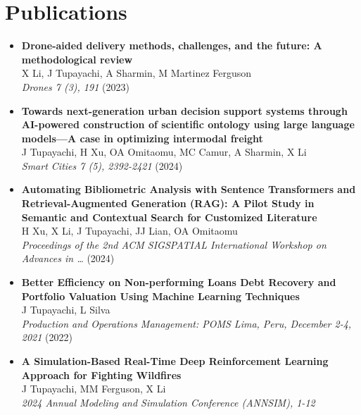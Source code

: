 \documentclass[10pt, letterpaper]{article}
\begin{document}
    \section*{Publications}

    \begin{itemize}[left=0pt] %
        \item \textbf{Drone-aided delivery methods, challenges, and the future: A methodological review} \\
        X Li, J Tupayachi, A Sharmin, M Martinez Ferguson \\
        \textit{Drones 7 (3), 191} (2023) \\
    
        \item \textbf{Towards next-generation urban decision support systems through AI-powered construction of scientific ontology using large language models—A case in optimizing intermodal freight} \\
        J Tupayachi, H Xu, OA Omitaomu, MC Camur, A Sharmin, X Li \\
        \textit{Smart Cities 7 (5), 2392-2421} (2024) \\
    
        \item \textbf{Automating Bibliometric Analysis with Sentence Transformers and Retrieval-Augmented Generation (RAG): A Pilot Study in Semantic and Contextual Search for Customized Literature} \\
        H Xu, X Li, J Tupayachi, JJ Lian, OA Omitaomu \\
        \textit{Proceedings of the 2nd ACM SIGSPATIAL International Workshop on Advances in …} (2024) \\
    
        \item \textbf{Better Efficiency on Non-performing Loans Debt Recovery and Portfolio Valuation Using Machine Learning Techniques} \\
        J Tupayachi, L Silva \\
        \textit{Production and Operations Management: POMS Lima, Peru, December 2-4, 2021} (2022) \\
    
    
        \item \textbf{A Simulation-Based Real-Time Deep Reinforcement Learning Approach for Fighting Wildfires} \\
        J Tupayachi, MM Ferguson, X Li \\
        \textit{2024 Annual Modeling and Simulation Conference (ANNSIM), 1-12} \\
    \end{itemize}
    
\end{document}

